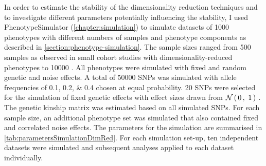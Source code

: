 In order to estimate the stability of the dimensionality reduction techniques and to investigate different parameters potentially influencing the stability, I used PhenotypeSimulator (\cref{chapter:simulation}) to simulate datasets of \num{1000} phenotypes with different numbers of samples and phenotype components as described in \cref{section:phenotype-simulation}. The sample sizes ranged from \num{500} samples as observed in small cohort studies with dimensionality-reduced phenotypes \citep{Pausova2007} to \num{10000} \citep{Liu2012}. All phenotypes were simulated with fixed and random genetic and noise effects. A total of \num{50000} SNPs was simulated with allele frequencies of \numlist{0.1;0.2;0.4} chosen at equal probability. \num{20} SNPs were selected for the simulation of fixed genetic effects with effect sizes drawn from \(\mathcal{N}\left(\,{0}\,,~{1}\,\right)\) . The genetic kinship matrix was estimated based on all simulated SNPs. For each sample size, an additional phenotype set was simulated that also contained fixed and correlated noise effects. The parameters for the simulation are summarised in \cref{tab:parametersSimulationDimRed}. For each simulation set-up, ten independent datasets were simulated and subsequent analyses applied to each dataset individually.


